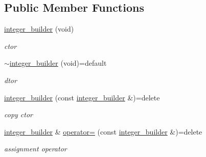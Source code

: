 \subsection*{Public Member Functions}
\begin{DoxyCompactItemize}
\item 
\mbox{\label{classcpp__redis_1_1builders_1_1integer__builder_a9ff2d3d27da0fb8b98fc4a0ea255fece}} 
\hyperlink{classcpp__redis_1_1builders_1_1integer__builder_a9ff2d3d27da0fb8b98fc4a0ea255fece}{integer\+\_\+builder} (void)
\begin{DoxyCompactList}\small\item\em ctor \end{DoxyCompactList}\item 
\mbox{\label{classcpp__redis_1_1builders_1_1integer__builder_ab2b797dd89b1bdec50f8ccf07633162f}} 
\hyperlink{classcpp__redis_1_1builders_1_1integer__builder_ab2b797dd89b1bdec50f8ccf07633162f}{$\sim$integer\+\_\+builder} (void)=default
\begin{DoxyCompactList}\small\item\em dtor \end{DoxyCompactList}\item 
\mbox{\label{classcpp__redis_1_1builders_1_1integer__builder_ab451b7fe5de8cf6f618cf9be1569aa41}} 
\hyperlink{classcpp__redis_1_1builders_1_1integer__builder_ab451b7fe5de8cf6f618cf9be1569aa41}{integer\+\_\+builder} (const \hyperlink{classcpp__redis_1_1builders_1_1integer__builder}{integer\+\_\+builder} \&)=delete
\begin{DoxyCompactList}\small\item\em copy ctor \end{DoxyCompactList}\item 
\mbox{\label{classcpp__redis_1_1builders_1_1integer__builder_a259905e8a34765d6ff9d2dd64f444b54}} 
\hyperlink{classcpp__redis_1_1builders_1_1integer__builder}{integer\+\_\+builder} \& \hyperlink{classcpp__redis_1_1builders_1_1integer__builder_a259905e8a34765d6ff9d2dd64f444b54}{operator=} (const \hyperlink{classcpp__redis_1_1builders_1_1integer__builder}{integer\+\_\+builder} \&)=delete
\begin{DoxyCompactList}\small\item\em assignment operator \end{DoxyCompactList}\item 

\end{DoxyCompactItemize}
